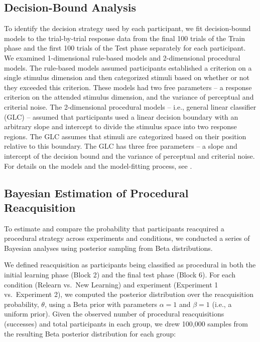 \documentclass{article}
\begin{document}
\subsection{Decision-Bound Analysis}
To identify the decision strategy used by each participant,
we fit decision-bound models \parencite{AshbyValentin2018}
to the trial-by-trial response data from the final 100
trials of the Train phase and the first 100 trials of the
Test phase separately for each participant. We examined
1-dimensional rule-based models and 2-dimensional procedural
models.  The rule-based models assumed participants
established a criterion on a single stimulus dimension and
then categorized stimuli based on whether or not they
exceeded this criterion. These models had two free
parameters -- a response criterion on the attended stimulus
dimension, and the variance of perceptual and criterial
noise. The 2-dimensional procedural models -- i.e., general
linear classifier (GLC) --  assumed that participants used a
linear decision boundary with an arbitrary slope and
intercept to divide the stimulus space into two response
regions. The GLC assumes that stimuli are categorized based
on their position relative to this boundary. The GLC has
three free parameters -- a slope and intercept of the
decision bound and the variance of perceptual and criterial
noise. For details on the models and the model-fitting
process, see \textcite{AshbyValentin2018}.

\subsection{Bayesian Estimation of Procedural Reacquisition}
To estimate and compare the probability that participants
reacquired a procedural strategy across experiments and
conditions, we conducted a series of Bayesian analyses using
posterior sampling from Beta distributions. 

We defined reacquisition as participants being classified as
procedural in both the initial learning phase (Block 2) and
the final test phase (Block 6). For each condition (Relearn
vs.\ New Learning) and experiment (Experiment 1 vs.\
Experiment 2), we computed the posterior distribution over
the reacquisition probability, $\theta$, using a Beta prior
with parameters $\alpha = 1$ and $\beta = 1$ (i.e., a
uniform prior). Given the observed number of procedural
reacquisitions (successes) and total participants in each
group, we drew 100{,}000 samples from the resulting Beta
posterior distribution for each group:
\end{document}
